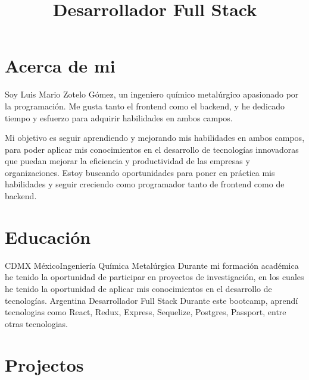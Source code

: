 \documentclass[11pt,a4paper]{moderncv}
\title{Desarrollador Full Stack}
\begin{document}
\maketitle
\section{Acerca de mi}
Soy Luis Mario Zotelo Gómez, un ingeniero químico metalúrgico apasionado por la programación. Me gusta tanto el frontend como el backend, y he dedicado tiempo y esfuerzo para adquirir habilidades en ambos campos.

Mi objetivo es seguir aprendiendo y mejorando mis habilidades en ambos campos, para poder aplicar mis conocimientos en el desarrollo de tecnologías innovadoras que puedan mejorar la eficiencia y productividad de las empresas y organizaciones. Estoy buscando oportunidades para poner en práctica mis habilidades y seguir creciendo como programador tanto de frontend como de backend.
\section{Educación}
{CDMX México}{Ingeniería Química Metalúrgica }
{Durante mi formación académica he tenido la oportunidad de participar en proyectos de investigación, en los cuales he tenido la oportunidad de aplicar mis conocimientos en el desarrollo de tecnologías.}
{Argentina}{ Desarrollador Full Stack }
{Durante este bootcamp, aprendí tecnologias como React, Redux, Express, Sequelize, Postgres, Passport, entre otras tecnologias.}

\section{ Projectos }
\end{document}
